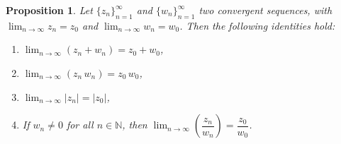 \documentclass{amsart}
\newtheorem{prop}{Proposition}
\begin{document}
\begin{prop}
Let \(\{z_n\}_{n=1}^{\infty}\) and \(\{w_n\}_{n=1}^{\infty}\) two convergent sequences, with \(\lim_{n\to\infty}z_n = z_0\) and \(\lim_{n\to\infty}w_n = w_0\). Then the following identities hold:

\begin{enumerate}
\item \(\displaystyle\lim_{n\to\infty}(z_n + w_n) = z_0 + w_0\),
\item \(\displaystyle\lim_{n\to\infty}(z_n \, w_n) = z_0 \, w_0\),
\item \(\displaystyle\lim_{n\to\infty}|z_n| = |z_0|\),
\item If \(w_n \neq 0\) for all \(n\in \mathbb{N}\), then \(\displaystyle\lim_{n\to\infty}\left(\dfrac{z_n}{w_n}\right) = \dfrac{z_0}{w_0}\).
\end{enumerate}
\end{prop}
\end{document}
